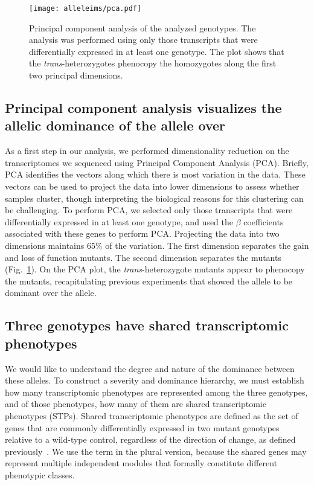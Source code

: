 \begin{figure}
  \centering{}
  \texttt{[image: alleleims/pca.pdf]}
  \caption{
           Principal component analysis of the analyzed genotypes. The
           analysis was performed using only those transcripts that were
           differentially expressed in at least one genotype. The plot shows
           that the \emph{trans}-heterozygotes phenocopy the \bx{} homozygotes
           along the first two principal dimensions.
           }
\label{fig:allelic_pca}
\end{figure}

\subsection*{Principal component analysis visualizes the allelic dominance of
             the \bx{} allele over \sy{}}
As a first step in our analysis, we performed dimensionality reduction on the
transcriptomes we sequenced using Principal Component Analysis (PCA). Briefly,
PCA identifies the vectors along which there is most variation in the data.
These vectors can be used to project the data into lower dimensions to assess
whether samples cluster, though interpreting the biological reasons for this
clustering can be challenging. To perform PCA, we selected only those
transcripts that were differentially expressed in at least one genotype, and
used the $\beta$ coefficients associated with these genes to perform PCA.\@
Projecting the data into two dimensions maintains 65\% of the variation. The
first dimension separates the gain and loss of function  mutants.
The second dimension separates the \dpy{} mutants (Fig.~\ref{fig:allelic_pca}). On the
PCA plot, the \emph{trans}-heterozygote mutants appear to phenocopy the \bx{}
mutants, recapitulating previous experiments that showed the \bx{} allele to be
dominant over the \sy{} allele.

\subsection*{Three \dpy{} genotypes have shared transcriptomic
             phenotypes}
We would like to understand the degree and nature of the dominance
between these \dpy{} alleles. To construct a severity and dominance hierarchy,
we must establish how many transcriptomic phenotypes are represented among the
three \dpy{} genotypes, and of those phenotypes, how many of them are shared
transcriptomic phenotypes (STPs). Shared transcriptomic phenotypes are defined
as the set of genes that are commonly differentially expressed in two mutant
genotypes relative to a wild-type control, regardless of the direction of
change, as defined previously~\citep{AngelesAlboresHIF}. We use the term in the
plural version, because the shared genes may represent multiple independent
modules that formally constitute different phenotypic classes.

